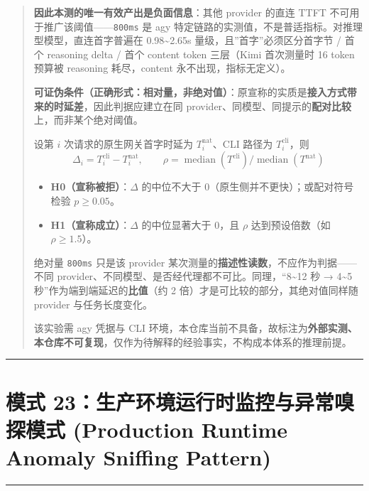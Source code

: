 \begin{quote}
\textbf{因此本测的唯一有效产出是负面信息}：其他 provider 的直连 TTFT
不可用于推广该阈值------\texttt{800ms} 是 agy
特定链路的实测值，不是普适指标。对推理型模型，直连首字普遍在
0.98\textasciitilde2.65s 量级，且''首字''必须区分首字节 / 首个 reasoning
delta / 首个 content token 三层（Kimi 首次测量时 16 token 预算被
reasoning 耗尽，content 永不出现，指标无定义）。

\textbf{可证伪条件（正确形式：相对量，非绝对值）}：原宣称的实质是\textbf{接入方式带来的时延差}，因此判据应建立在同
provider、同模型、同提示的\textbf{配对比较}上，而非某个绝对阈值。

设第 \(i\) 次请求的原生网关首字时延为 \(T^{\text{nat}}_i\)、CLI 路径为
\(T^{\text{cli}}_i\)，则
\[\Delta_i=T^{\text{cli}}_i-T^{\text{nat}}_i,\qquad \rho=\operatorname{median}\!\left(T^{\text{cli}}\right)\big/\operatorname{median}\!\left(T^{\text{nat}}\right)\]

\begin{itemize}
\tightlist
\item
  \textbf{H0（宣称被拒）}：\(\Delta\) 的中位不大于
  0（原生侧并不更快）；或配对符号检验 \(p\ge0.05\)。
\item
  \textbf{H1（宣称成立）}：\(\Delta\) 的中位显著大于 0，且 \(\rho\)
  达到预设倍数（如 \(\rho\ge1.5\)）。
\end{itemize}

绝对量 \texttt{800ms} 只是该 provider
某次测量的\textbf{描述性读数}，不应作为判据------不同
provider、不同模型、是否经代理都不可比。同理，``8\textasciitilde12 秒 →
4\textasciitilde5 秒''作为端到端延迟的\textbf{比值}（约 2
倍）才是可比较的部分，其绝对值同样随 provider 与任务长度变化。

该实验需 agy 凭据与 CLI
环境，本仓库当前不具备，故标注为\textbf{外部实测、本仓库不可复现}，仅作为待解释的经验事实，不构成本体系的推理前提。
\end{quote}

\begin{center}\rule{0.5\linewidth}{0.5pt}\end{center}

\section{模式 23：生产环境运行时监控与异常嗅探模式 (Production Runtime
Anomaly Sniffing
Pattern)}\label{ux6a21ux5f0f-23ux751fux4ea7ux73afux5883ux8fd0ux884cux65f6ux76d1ux63a7ux4e0eux5f02ux5e38ux55c5ux63a2ux6a21ux5f0f-production-runtime-anomaly-sniffing-pattern}

\begin{center}\rule{0.5\linewidth}{0.5pt}\end{center}

